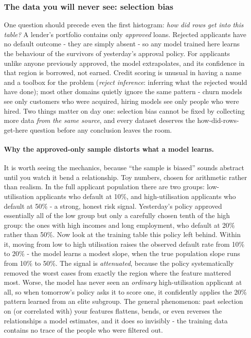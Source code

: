\documentclass[11pt,a4paper]{article}
\begin{document}
\subsubsection{The data you will never see: selection bias}
One question should precede even the first histogram: \emph{how did rows get
into this table?} A lender's portfolio contains only \emph{approved} loans.
Rejected applicants have no default outcome - they are simply absent -
so any model trained here learns the behaviour of the survivors of
yesterday's approval policy. For applicants unlike anyone previously
approved, the model extrapolates, and its confidence in that region is
borrowed, not earned. Credit scoring is unusual in having a name and a
toolbox for the problem (\emph{reject inference}: inferring what the
rejected would have done); most other domains quietly ignore the same
pattern - churn models see only customers who were acquired, hiring models
see only people who were hired. Two things matter on day one: selection
bias cannot be fixed by collecting more data \emph{from the same source},
and every dataset deserves the how-did-rows-get-here question before any
conclusion leaves the room.

\paragraph{Why the approved-only sample distorts what a model learns.}
It is worth seeing the mechanics, because ``the sample is biased'' sounds
abstract until you watch it bend a relationship. Toy numbers, chosen for
arithmetic rather than realism. In the full applicant population there are
two groups: low-utilisation applicants who default at 10\%, and
high-utilisation applicants who default at 50\% - a strong, honest risk
signal. Yesterday's policy approved essentially all of the low group but
only a carefully chosen tenth of the high group: the ones with high
incomes and long employment, who default at 20\% rather than 50\%. Now
look at the training table this policy left behind. Within it, moving from
low to high utilisation raises the observed default rate from 10\% to 20\%
- the model learns a modest slope, when the true population slope runs
from 10\% to 50\%. The signal is \emph{attenuated}, because the policy
systematically removed the worst cases from exactly the region where the
feature mattered most. Worse, the model has never seen an \emph{ordinary}
high-utilisation applicant at all, so when tomorrow's policy asks it to
score one, it confidently applies the 20\% pattern learned from an elite
subgroup. The general phenomenon: past selection on (or correlated with)
your features flattens, bends, or even reverses the relationships a model
estimates, and it does so invisibly - the training data contains no trace
of the people who were filtered out.
\end{document}
